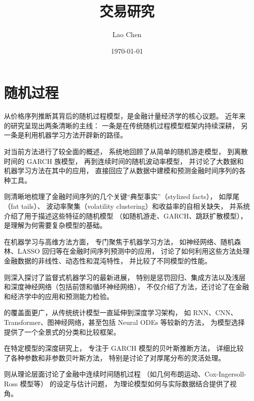 \documentclass[a4paper,10pt]{article}
\begin{document}
\title{\textbf{交易研究}\\ \large }
\author{Lao Chen}
\date{\today}
\maketitle
\tableofcontents

\section{随机过程}

从价格序列推断其背后的随机过程模型，是金融计量经济学的核心议题。
近年来的研究呈现出两条清晰的主线：
一条是在传统随机过程模型框架内持续深耕，
另一条是利用机器学习方法开辟新的路径。

\cite{MaungSwanson2025Forecasting} 
对当前方法进行了较全面的概述，
系统地回顾了从简单的随机游走模型，
到离散时间的 GARCH 族模型，
再到连续时间的随机波动率模型，
并讨论了大数据和机器学习方法在其中的应用，
直接回应了从数据中建模和预测金融时间序列的各种工具。

\cite{Chakraborti2007FinTSOverview} 
则清晰地梳理了金融时间序列的几个关键“典型事实”（stylized facts），
如厚尾（fat tails）、
波动率聚集（volatility clustering）和收益率的自相关缺失，
并系统介绍了用于描述这些特征的随机模型
（如随机游走、GARCH、跳跃扩散模型），
是理解为何需要复杂模型的基础。

在机器学习与高维方法方面，
\cite{Yang2025MLFinTS} 
专门聚焦于机器学习方法，
如神经网络、随机森林、LASSO 回归等在金融时间序列预测中的应用，
讨论了如何利用这些方法处理金融数据的非线性、动态性和混沌特性，
并比较了不同模型的性能。

\cite{Masini2023MLAdvances} 
则深入探讨了监督式机器学习的最新进展，
特别是惩罚回归、集成方法以及浅层和深度神经网络（包括前馈和循环神经网络），
不仅介绍了方法，还讨论了在金融和经济学中的应用和预测能力检验。

\cite{EmmertStreib2026TSFMethods} 
的覆盖面更广，从传统统计模型一直延伸到深度学习架构，
如 RNN、CNN、Transformer、图神经网络，甚至包括 Neural ODEs 等较新的方法，
为模型选择提供了一个全景式的分类和比较框架。

在特定模型的深度研究上，
\cite{Virbickaite2015BayesianGARCH}
专注于 GARCH 模型的贝叶斯推断方法，
详细比较了各种参数和非参数贝叶斯方法，
特别是讨论了对厚尾分布的灵活处理。

\cite{Sims2010ContinuousTime} 
则从理论层面讨论了金融中连续时间随机过程
（如几何布朗运动、Cox-Ingersoll-Ross 模型等）
的设定与估计问题，
为理论模型如何与实际数据结合提供了视角。
\end{document}
